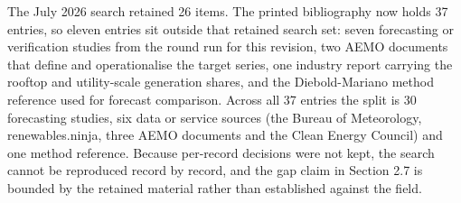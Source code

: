 The July 2026 search retained 26 items. The printed bibliography now holds 37 entries, so eleven entries sit outside that retained search set: seven forecasting or verification studies from the round run for this revision, two AEMO documents that define and operationalise the target series, one industry report carrying the rooftop and utility-scale generation shares, and the Diebold-Mariano method reference used for forecast comparison. Across all 37 entries the split is 30 forecasting studies, six data or service sources (the Bureau of Meteorology, renewables.ninja, three AEMO documents and the Clean Energy Council) and one method reference. Because per-record decisions were not kept, the search cannot be reproduced record by record, and the gap claim in Section 2.7 is bounded by the retained material rather than established against the field.
